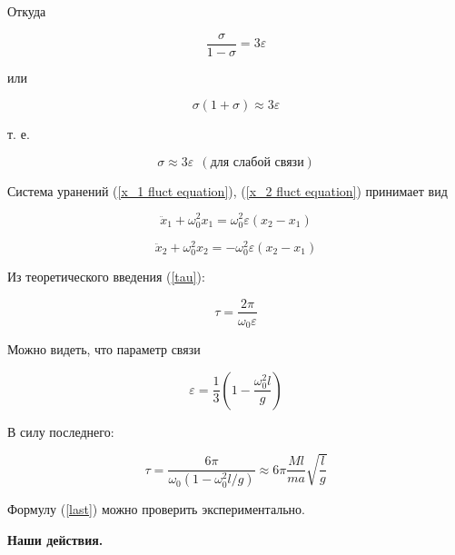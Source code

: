 \documentclass[14pt]{article}
\begin{document}
\noindent Откуда

$$
\frac{\sigma}{1 - \sigma} = 3\varepsilon
$$

\noindent или

$$
\sigma(1 + \sigma) \approx 3\varepsilon
$$

\noindent т. е.

$$
\sigma \approx 3\varepsilon ~~(\text{для слабой связи})
$$

\noindent Система уранений (\ref{x_1 fluct equation}), (\ref{x_2 fluct equation}) принимает вид

\begin{equation}
\ddot x_1 + \omega_0^2x_1 = \omega_0^2\varepsilon(x_2 - x_1)
\end{equation}

\begin{equation}
\ddot x_2 + \omega_0^2x_2 = -\omega_0^2\varepsilon(x_2 - x_1)
\end{equation}

Из теоретического введения (\ref{tau}):

$$
\tau = \frac{2\pi}{\omega_0\varepsilon}
$$

\noindent Можно видеть, что параметр связи 

$$
\varepsilon = \frac{1}{3}\left( 1 - \frac{\omega_0^2l}{g} \right)
$$

\noindent В силу последнего:

\begin{equation}\label{last}
\tau = \frac{6\pi}{\omega_0(1 - \omega_0^2l/g)} \approx 6\pi\frac{Ml}{ma}\sqrt{\frac{l}{g}}
\end{equation}

\noindent Формулу (\ref{last}) можно проверить экспериментально.

\newpage
\textbf{Наши действия.}
\vspace{1cm}
\end{document}
